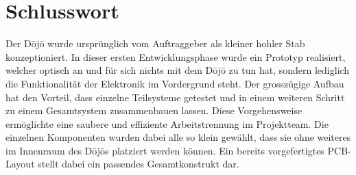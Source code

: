 \section{Schlusswort} \label{sec:schlusswort}

Der Dōjō wurde ursprünglich vom Auftraggeber als kleiner hohler Stab konzeptioniert. In dieser ersten Entwicklungsphase wurde ein Prototyp realisiert, welcher optisch an und für sich nichts mit dem Dōjō zu tun hat, sondern lediglich die Funktionalität der Elektronik im Vordergrund steht. Der grosszügige Aufbau hat den Vorteil, dass einzelne Teilsysteme getestet und in einem weiteren Schritt zu einem Gesamtsystem zusammenbauen lassen. Diese Vorgehensweise ermöglichte eine saubere und effiziente Arbeitstrennung im Projektteam. Die einzelnen Komponenten wurden dabei alle so klein gewählt, dass sie ohne weiteres im Innenraum des Dōjōs platziert werden können. Ein bereits vorgefertigtes PCB-Layout stellt dabei ein passendes Gesamtkonstrukt dar.

